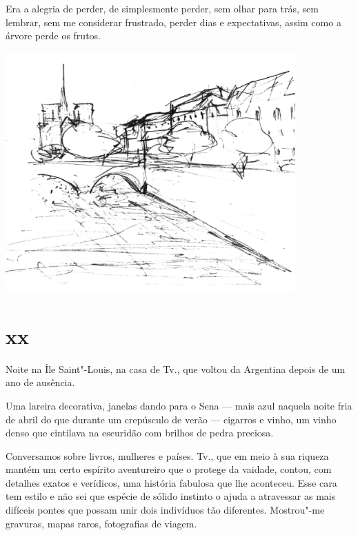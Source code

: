 Era a alegria de perder, de simplesmente perder, sem olhar para trás,
sem lembrar, sem me considerar frustrado, perder dias e expectativas,
assim como a árvore perde os frutos.

\pagebreak
\thispagestyle{empty}

\begin{center}
\vspace*{2.5cm}
\hspace*{-1.2cm}\includegraphics[width=111mm]{./imgs/canal2.jpg}
\end{center}

\pagebreak

\section{xx}

Noite na Île Saint"-Louis, na casa de Tv., que voltou da Argentina depois
de um ano de ausência.

Uma lareira decorativa, janelas dando para o Sena --- mais azul naquela
noite fria de abril do que durante um crepúsculo de verão --- cigarros e
vinho, um vinho denso que cintilava na escuridão com brilhos de pedra
preciosa.

Conversamos sobre livros, mulheres e países. Tv., que em meio à sua
riqueza mantém um certo espírito aventureiro que o protege da vaidade,
contou, com detalhes exatos e verídicos, uma história fabulosa que lhe
aconteceu. Esse cara tem estilo e não sei que espécie de sólido
instinto o ajuda a atravessar as mais difíceis pontes que possam
unir dois indivíduos tão diferentes. Mostrou"-me gravuras, mapas raros,
fotografias de viagem.

